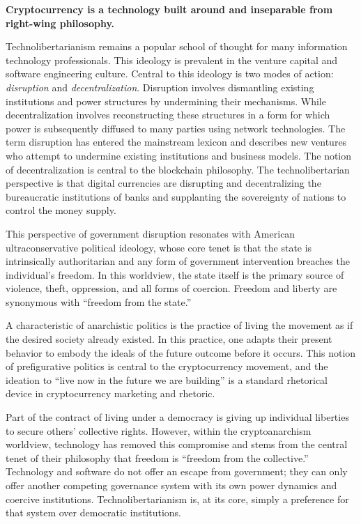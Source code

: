 \begin{infobox}
 \textbf{
    Cryptocurrency is a technology built around and inseparable from right-wing
    philosophy.
  }
\end{infobox}

Technolibertarianism remains a popular school of thought for many information
technology professionals. This ideology is prevalent in the venture capital and
software engineering culture. Central to this ideology is two modes of action:
\textit{disruption} and \textit{decentralization}. Disruption involves
dismantling existing institutions and power structures by undermining their
mechanisms. While decentralization involves reconstructing these structures in a
form for which power is subsequently diffused to many parties using network
technologies. The term disruption has entered the mainstream lexicon and
describes new ventures who attempt to undermine existing institutions and
business models. The notion of decentralization is central to the blockchain
philosophy. The technolibertarian perspective is that digital currencies are
disrupting and decentralizing the bureaucratic institutions of banks and
supplanting the sovereignty of nations to control the money supply.


This perspective of government disruption resonates with American
ultraconservative political ideology, whose core tenet is that the state is
intrinsically authoritarian and any form of government intervention breaches the
individual's freedom. In this worldview, the state itself is the primary source
of violence, theft, oppression, and all forms of coercion. Freedom and liberty
are synonymous with ``freedom from the state.''

A characteristic of anarchistic politics is the practice of living the movement
as if the desired society already existed. In this practice, one adapts their
present behavior to embody the ideals of the future outcome before it occurs.
This notion of prefigurative politics is central to the cryptocurrency movement,
and the ideation to ``live now in the future we are building'' is a standard
rhetorical device in cryptocurrency marketing and rhetoric.
\cite{jeong_bitcoin_2013}


Part of the contract of living under a democracy is giving up individual
liberties to secure others' collective rights. However, within the
cryptoanarchism worldview, technology has removed this compromise and stems from
the central tenet of their philosophy that freedom is ``freedom from the
collective.'' Technology and software do not offer an escape from government;
they can only offer another competing governance system with its own power
dynamics and coercive institutions. Technolibertarianism is, at its core, simply
a preference for that system over democratic institutions.
\cite{bogost_cryptocurrency_2017, golumbia_politics_2016}

